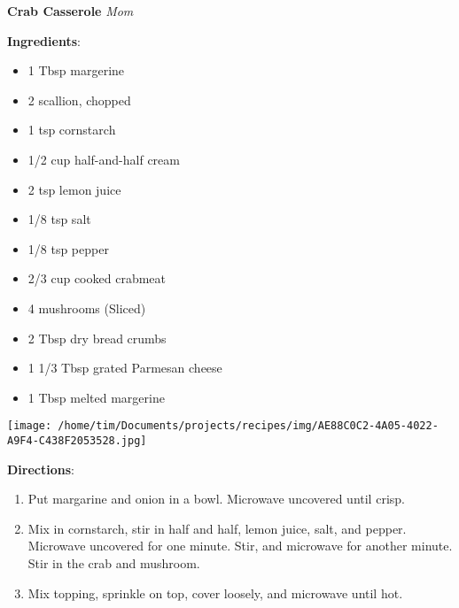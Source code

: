 \documentclass[11pt, twoside, openany]{book}
\begin{document}
\noindent\begin{minipage}[t]{\linewidth}%
{\Large\textbf{Crab Casserole}} \label{crab-casserole}\hfill\textit{Mom}\\
\noindent\begin{minipage}[t]{0.78\linewidth}%
\textbf{Ingredients}:\vspace{-3mm}
\begin{multicols}{2}
\begin{itemize}\setlength\itemsep{-1mm}
\item 1 Tbsp margerine
\item 2 scallion, chopped
\item 1 tsp cornstarch
\item 1/2 cup half-and-half cream
\item 2 tsp lemon juice
\item 1/8 tsp salt
\item 1/8 tsp pepper
\item 2/3 cup cooked crabmeat
\item 4 mushrooms (Sliced)
\item 2 Tbsp dry bread crumbs
\item 1 1/3 Tbsp grated Parmesan cheese
\item 1 Tbsp melted margerine
\end{itemize}
\end{multicols}
\end{minipage}
\noindent\begin{minipage}[t]{0.18\linewidth}
\centering \strut\vspace*{-\baselineskip}\newline
\texttt{[image: /home/tim/Documents/projects/recipes/img/AE88C0C2-4A05-4022-A9F4-C438F2053528.jpg]}\\
\end{minipage}\vspace{3mm}
\textbf{Directions}:
\vspace{-3mm}\begin{enumerate}\setlength\itemsep{-1mm}
\item Put margarine and onion in a bowl. Microwave uncovered until crisp.
\item Mix in cornstarch, stir in half and half, lemon juice, salt, and pepper. Microwave uncovered for one minute. Stir, and microwave for another minute. Stir in the crab and mushroom.
\item Mix topping, sprinkle on top, cover loosely, and microwave until hot.
\end{enumerate}
\end{minipage}\vspace{8mm}
\end{document}
